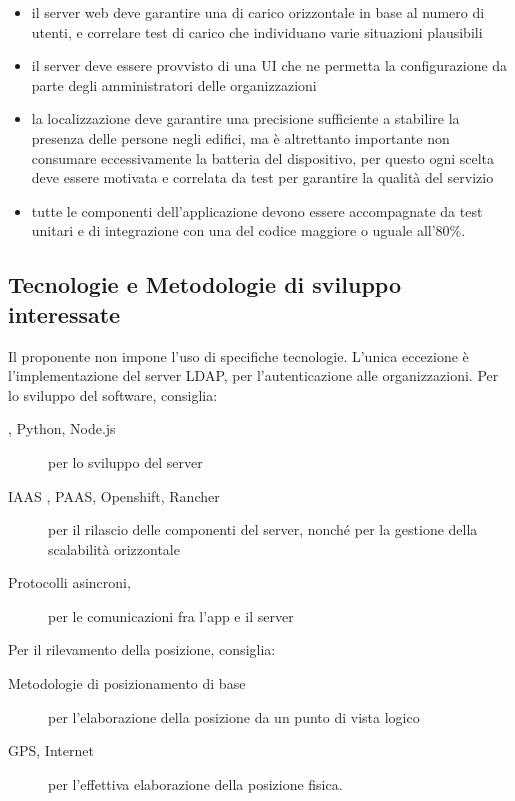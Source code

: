 \documentclass[../studio-di-fattibilita.tex]{subfiles}
\begin{document}
\begin{itemize}
    \item il server web deve garantire una  di carico orizzontale in base al numero di utenti, e correlare test di carico che individuano varie situazioni plausibili
    \item il server deve essere provvisto di una UI che ne permetta la configurazione da parte degli amministratori delle organizzazioni
    \item la localizzazione deve garantire una precisione sufficiente a stabilire la presenza delle persone negli edifici, ma è altrettanto importante non consumare eccessivamente la batteria del dispositivo, per questo ogni scelta deve essere motivata e correlata da test per garantire la qualità del servizio
    \item tutte le componenti dell’applicazione devono essere accompagnate da test unitari e di integrazione con una  del codice maggiore o uguale all'80\%.
  \end{itemize}


  \subsection{Tecnologie e Metodologie di sviluppo interessate}%
  \label{subsec:tecnologie_interessate}
  Il proponente non impone l'uso di specifiche tecnologie. L'unica eccezione è l'implementazione del server LDAP, per l'autenticazione alle organizzazioni.
  Per lo sviluppo del software, consiglia:
  \begin{description}
    \item[, Python, Node.js] per lo sviluppo del server
    \item[IAAS , PAAS, Openshift, Rancher] per il rilascio delle componenti del server, nonché per la gestione della scalabilità orizzontale
    \item[Protocolli asincroni, ] per le comunicazioni fra l'app e il server
  \end{description}

  Per il rilevamento della posizione, consiglia:
  \begin{description}
    \item[Metodologie di posizionamento di base] per l'elaborazione della posizione da un punto di vista logico
    \item[GPS, Internet] per l'effettiva elaborazione della posizione fisica.
  \end{description}
\end{document}
